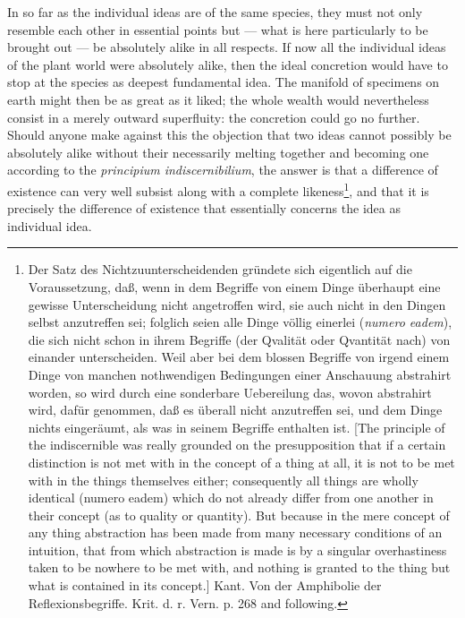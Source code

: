 \documentclass[12pt,a4paper]{book}
\begin{document}
In so far as the individual ideas are of the same species, they must not only
resemble each other in essential points but --- what is here particularly to be
brought out --- be absolutely alike in all respects. If now all the individual
ideas of the plant world were absolutely alike, then the ideal concretion would
have to stop at the species as deepest fundamental idea. The manifold of specimens
on earth might then be as great as it liked; the whole wealth would nevertheless
consist in a merely outward superfluity: the concretion could go no further. Should
anyone make against this the objection that two ideas cannot possibly be absolutely
alike without their necessarily melting together and becoming one according to the
\textit{principium indiscernibilium}, the answer is that a difference of existence
can very well subsist along with a complete likeness\footnote{Der Satz des
Nichtzuunterscheidenden gründete sich eigentlich auf die Voraussetzung, daß, wenn
in dem Begriffe von einem Dinge überhaupt eine gewisse Unterscheidung nicht
angetroffen wird, sie auch nicht in den Dingen selbst anzutreffen sei; folglich
seien alle Dinge völlig einerlei (\textit{numero eadem}), die sich nicht schon in
ihrem Begriffe (der Qvalität oder Qvantität nach) von einander unterscheiden. Weil
aber bei dem blossen Begriffe von irgend einem Dinge von manchen nothwendigen
Bedingungen einer Anschauung abstrahirt worden, so wird durch eine sonderbare
Uebereilung das, wovon abstrahirt wird, dafür genommen, daß es überall nicht
anzutreffen sei, und dem Dinge nichts eingeräumt, als was in seinem Begriffe
enthalten ist. [The principle of the indiscernible was really grounded on the
presupposition that if a certain distinction is not met with in the concept of a
thing at all, it is not to be met with in the things themselves either;
consequently all things are wholly identical (numero eadem) which do not already
differ from one another in their concept (as to quality or quantity). But because in
the mere concept of any thing abstraction has been made from many necessary
conditions of an intuition, that from which abstraction is made is by a singular
overhastiness taken to be nowhere to be met with, and nothing is granted to the
thing but what is contained in its concept.] Kant. Von der Amphibolie der
Reflexionsbegriffe. Krit. d. r. Vern. p. 268 and following.},
and that it is precisely the difference of existence that essentially concerns the
idea as individual idea.
\end{document}
